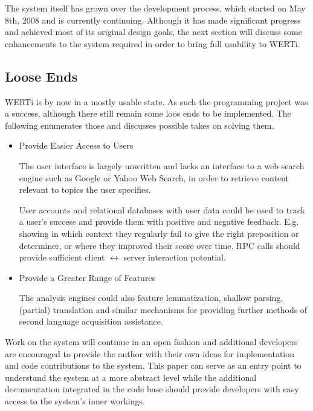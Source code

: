 \documentclass[12pt]{article}
\begin{document}
The system itself has grown over the development process, which started on May
8th, 2008 and is currently continuing. Although it has made significant progress
and achieved most of its original design goals, the next section will discuss
some enhancements to the system required in order to bring full usability to
WERTi.

\subsection{Loose Ends}

WERTi is by now in a mostly usable state. As such the programming project was a
success, although there still remain some loos ends to be implemented. The
following enumerates those and discusses possible takes on solving them.
\begin{itemize}
\item{Provide Easier Access to Users}

The user interface is largely unwritten and lacks an interface to a web search
engine such as Google or Yahoo Web Search, in order to retrieve content relevant
to topics the user specifies.

User accounts and relational databases with user data could be used to track a
user's success and provide them with positive and negative feedback. E.g.
showing in which context they regularly fail to give the right preposition or
determiner, or where they improved their score over time. RPC calls should
provide sufficient client $\leftrightarrow$ server interaction potential.

\item{Provide a Greater Range of Features}

The analysis engines could also feature lemmatization, shallow parsing,
(partial) translation and similar mechanisms for providing further methods of
second language acquisition assistance. %
\end{itemize}

Work on the system will continue in an open fashion and additional developers
are encouraged to provide the author with their own ideas for implementation and
code contributions to the system. This paper can serve as an entry point to
understand the system at a more abstract level while the additional
documentation integrated in the code base should provide developers with easy
access to the system's inner workings.
\end{document}
